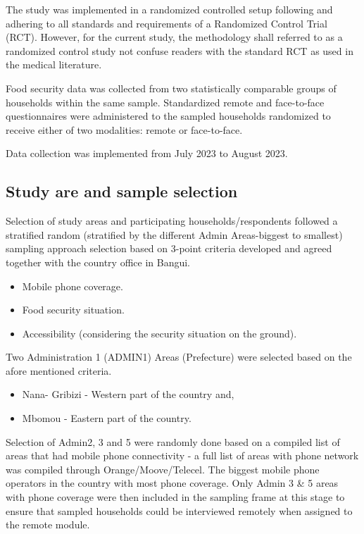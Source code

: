 \documentclass[11pt,harvard]{article}
\begin{document}
	The study was implemented in a randomized controlled setup following and adhering to all standards and requirements of a Randomized Control Trial (RCT). However, for the current study, the methodology shall referred to as a randomized control study not confuse readers with the standard RCT as used in the medical literature. 
	
	Food security data was collected from two statistically comparable groups of households within the same sample. Standardized remote and face-to-face questionnaires were administered to the sampled households randomized to receive either of two modalities: remote or face-to-face. 
	
	
	Data collection was implemented from July 2023 to August 2023.
	
	\subsection{Study are and sample selection}
	
	Selection of study areas and participating households/respondents followed a stratified random (stratified by the different Admin Areas-biggest to smallest) sampling approach selection based on 3-point criteria developed and agreed together with the country office in Bangui. 
	
	\begin{itemize}
	\item[1.] Mobile phone coverage.
	\item[2.] Food security situation.
	\item[3.] Accessibility (considering the security situation on the ground).
	\end{itemize}
	
	Two Administration 1 (ADMIN1) Areas (Prefecture) were selected based on the afore mentioned criteria. 
	\begin{itemize}
	\item[1.] Nana- Gribizi - Western part of the country and,
	\item[2.] Mbomou - Eastern part of the country.
	\end{itemize}

	Selection of Admin2, 3 and 5 were randomly done based on a compiled list of areas that had mobile phone connectivity - a full list of areas with phone network was compiled through Orange/Moove/Telecel. The biggest mobile phone operators in the country with most phone coverage. Only Admin 3 \& 5 areas with phone coverage were then included in the sampling frame at this stage to ensure that sampled households could be interviewed remotely when assigned to the remote module. 
	
\end{document}
